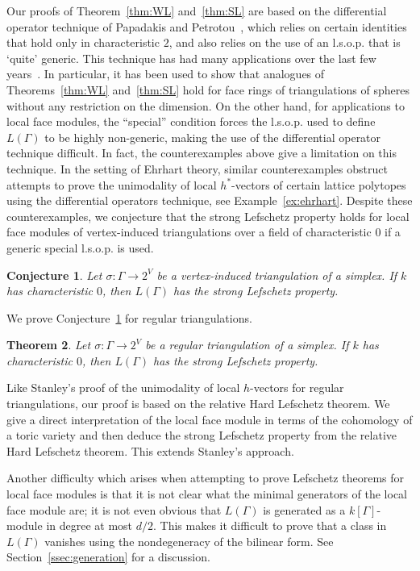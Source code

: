 \documentclass[11pt]{article}
\newtheorem{theo}{Theorem}[section]
\newtheorem{conj}[theo]{Conjecture}
\theoremstyle{definition}
\numberwithin{equation}{section}
\numberwithin{equation}{section}
\begin{document}
Our proofs of Theorem~\ref{thm:WL} and~\ref{thm:SL} are based on the differential operator technique of Papadakis and Petrotou~\cite{PapadakisPetrotoug}, which relies on certain identities that hold only in characteristic $2$, and also relies on the use of an l.s.o.p. that is `quite' generic. This technique has had many applications over the last few years~\cite{APP,APPS,KaruXiao,Oba,LNS,KLS,moment}.
In particular, it has been used to show that analogues of Theorems~\ref{thm:WL} and~\ref{thm:SL} hold for face rings of triangulations of spheres without any restriction on the dimension. 
On the other hand, for applications to local face modules,  the ``special'' condition forces the l.s.o.p. used to define $L(\Gamma)$ to be highly non-generic, making  the use of the differential operator technique difficult. In fact, the counterexamples above 
give a limitation on this technique. 
In the setting of Ehrhart theory, similar counterexamples obstruct attempts to prove the unimodality of 
local $h^*$-vectors
of certain lattice polytopes using the differential operators technique, see Example~\ref{ex:ehrhart}. Despite these counterexamples, we conjecture that the strong Lefschetz property holds for local face modules of vertex-induced triangulations over a field of characteristic $0$ if a generic special l.s.o.p. is used. 

\begin{conj}\label{conj:char0}
Let $\sigma \colon \Gamma \to 2^V$ be a vertex-induced triangulation of a simplex. If $k$ has characteristic $0$, then $L(\Gamma)$ has the strong Lefschetz property. 
\end{conj}

We prove Conjecture~\ref{conj:char0} for regular triangulations. 

\begin{theo}\label{thm:regular}
Let $\sigma \colon \Gamma \to 2^V$ be a regular triangulation of a simplex. If $k$ has characteristic $0$, then $L(\Gamma)$ has the strong Lefschetz property. 
\end{theo}

Like Stanley's proof of the unimodality of local $h$-vectors for regular triangulations, our proof is based on the relative Hard Lefschetz theorem. We give a direct interpretation of the local face module in terms of the cohomology of a toric variety and then deduce the strong Lefschetz property from the relative Hard Lefschetz theorem. This extends Stanley's approach. 

Another difficulty which arises when attempting to 
prove Lefschetz theorems for local face modules is that it is not clear what the minimal generators of the local face module are; it is not even obvious that $L(\Gamma)$ is generated as a $k[\Gamma]$-module in degree at most $d/2$. This makes it difficult to prove that a class in $L(\Gamma)$ vanishes using the nondegeneracy of the bilinear form. See Section~\ref{ssec:generation} for a discussion. 
\end{document}
